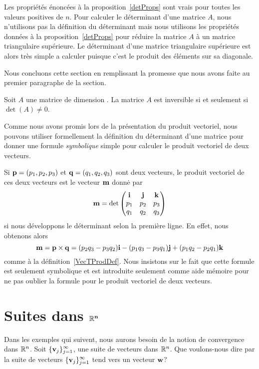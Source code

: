{Les propriétés énoncées à la proposition~\ref{detProps} sont vrais
pour toutes les valeurs positives de $n$.  Pour calculer le
déterminant d'une matrice $A$, nous n'utilisons pas la définition du
déterminant mais nous utilisons les propriétés données à la
proposition~\ref{detProps} pour réduire la matrice $A$ à un matrice
triangulaire supérieure.  Le déterminant d'une matrice triangulaire
supérieure est alors très simple a calculer puisque c'est le produit des
éléments sur sa diagonale.

Nous concluons cette section en remplissant la promesse que nous avons
faite au premier paragraphe de la section.

\begin{focus}{\thm} \label{AinvDetNN}
Soit $A$ une matrice de dimension \nn.  La matrice $A$ est inversible
si et seulement si $\det(A) \neq 0$.
\end{focus}

\begin{rmk}
Comme nous avons promis lors de la présentation du produit vectoriel,
nous pouvons utiliser formellement la définition du déterminant d'une
matrice  pour donner une formule {\em symbolique} simple pour
calculer le produit vectoriel de deux vecteurs.

Si $\mathbf{p} = (p_1,p_2,p_3)$ et $\mathbf{q} = (q_1, q_2, q_3)$ sont deux
vecteurs, le produit vectoriel de ces deux vecteurs est le vecteur
$\mathbf{m}$ donnė par
\[
\mathbf{m} = \det \begin{pmatrix}
\mathbf{i} & \mathbf{j} & \mathbf{k} \\
p_1 & p_2 & p_3 \\
q_1 & q_2 & q_3 
\end{pmatrix}
\]
si nous développons le déterminant selon la première ligne.  En effet, nous
obtenons alors
\[
\mathbf{m} = \mathbf{p} \times \mathbf{q}
= (p_2 q_3 - p_3 q_2) \mathbf{i} - (p_1 q_3 - p_3 q_1) \mathbf{j}
+ (p_1 q_2 - p_2 q_1) \mathbf{k}
\]
comme à la définition~\ref{VecTProdDef}.  Nous insistons sur le fait que
cette formule est seulement symbolique et est introduite seulement
comme aide mémoire pour ne pas oublier la formule pour le
produit vectoriel de deux vecteurs.
\label{DetermVectProd}
\end{rmk}
\section{Suites dans $\mathbf{\mathbb{R}^n}$}

Dans les exemples qui suivent, nous aurons besoin de la notion de
convergence dans $\mathbb{R}^n$.  Soit
$\displaystyle \{ \mathbf{v}_j \}_{j=1}^\infty$, une suite 
de vecteurs dans $\mathbb{R}^n$.  Que voulons-nous dire par la suite de
vecteurs $\displaystyle \{ \mathbf{v}_j \}_{j=1}^\infty$ tend vers un
vecteur $\mathbf{w}$? 

}
